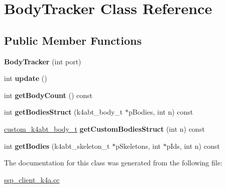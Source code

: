 \hypertarget{classBodyTracker}{}\section{Body\+Tracker Class Reference}
\label{classBodyTracker}
\subsection*{Public Member Functions}
\begin{DoxyCompactItemize}
\item 
\mbox{\label{classBodyTracker_acf1216c1aaa390787eb565c579e9d99c}} 
{\bfseries Body\+Tracker} (int port)
\item 
\mbox{\label{classBodyTracker_aad663cc418079524015bc11d99319601}} 
int {\bfseries update} ()
\item 
\mbox{\label{classBodyTracker_a00de4863a77d07f08266e3e2965e8db7}} 
int {\bfseries get\+Body\+Count} () const
\item 
\mbox{\label{classBodyTracker_a5e459f0f32a641b16c46d281be6546cd}} 
int {\bfseries get\+Bodies\+Struct} (k4abt\+\_\+body\+\_\+t $\ast$p\+Bodies, int n) const
\item 
\mbox{\label{classBodyTracker_abcfd07f2177e613ce648aa280c2cb42c}} 
\hyperlink{struct__custom__k4abt__body__t}{custom\+\_\+k4abt\+\_\+body\+\_\+t} {\bfseries get\+Custom\+Bodies\+Struct} (int n) const
\item 
\mbox{\label{classBodyTracker_aea722e5f85d6fea80d6460c9f46b6730}} 
int {\bfseries get\+Bodies} (k4abt\+\_\+skeleton\+\_\+t $\ast$p\+Skeletons, int $\ast$p\+Ids, int n) const
\end{DoxyCompactItemize}


The documentation for this class was generated from the following file\+:\begin{DoxyCompactItemize}
\item 
\hyperlink{ssp__client__k4a_8cc}{ssp\+\_\+client\+\_\+k4a.\+cc}\end{DoxyCompactItemize}
